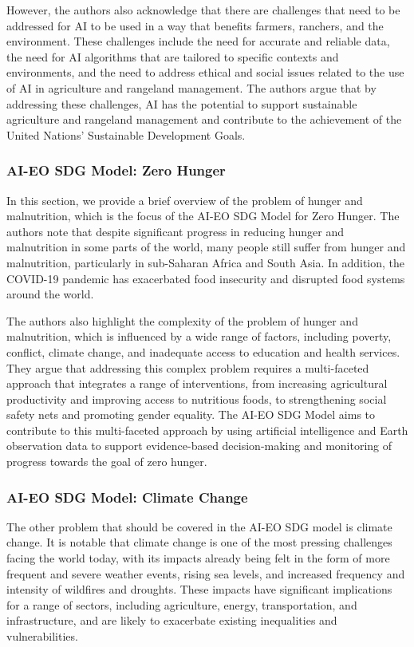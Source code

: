 \documentclass[draft, {\secondLanguage}, english]{volcanica-template}
\begin{document}
However, the authors also acknowledge that there are challenges that need to be addressed for AI to be used in a way that benefits farmers, ranchers, and the environment. These challenges include the need for accurate and reliable data, the need for AI algorithms that are tailored to specific contexts and environments, and the need to address ethical and social issues related to the use of AI in agriculture and rangeland management. The authors argue that by addressing these challenges, AI has the potential to support sustainable agriculture and rangeland management and contribute to the achievement of the United Nations' Sustainable Development Goals.
\subsubsection{AI-EO SDG Model: Zero Hunger}\label{sec:02aa}
In this section, we provide a brief overview of the problem of hunger and malnutrition, which is the focus of the AI-EO SDG Model for Zero Hunger. The authors note that despite significant progress in reducing hunger and malnutrition in some parts of the world, many people still suffer from hunger and malnutrition, particularly in sub-Saharan Africa and South Asia. In addition, the COVID-19 pandemic has exacerbated food insecurity and disrupted food systems around the world.

The authors also highlight the complexity of the problem of hunger and malnutrition, which is influenced by a wide range of factors, including poverty, conflict, climate change, and inadequate access to education and health services. They argue that addressing this complex problem requires a multi-faceted approach that integrates a range of interventions, from increasing agricultural productivity and improving access to nutritious foods, to strengthening social safety nets and promoting gender equality. The AI-EO SDG Model aims to contribute to this multi-faceted approach by using artificial intelligence and Earth observation data to support evidence-based decision-making and monitoring of progress towards the goal of zero hunger.

\subsubsection{AI-EO SDG Model: Climate Change}\label{sec:02ab}
The other problem that should be covered in the AI-EO SDG model is climate change. It is notable that climate change is one of the most pressing challenges facing the world today, with its impacts already being felt in the form of more frequent and severe weather events, rising sea levels, and increased frequency and intensity of wildfires and droughts. These impacts have significant implications for a range of sectors, including agriculture, energy, transportation, and infrastructure, and are likely to exacerbate existing inequalities and vulnerabilities.
\end{document}
